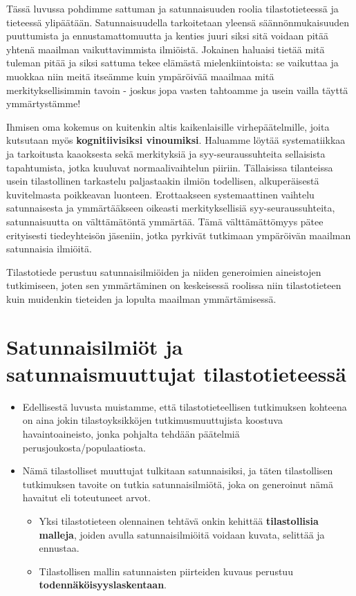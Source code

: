 \documentclass[
]{book}
\providecommand{\tightlist}{%
  \setlength{\itemsep}{0pt}\setlength{\parskip}{0pt}}
\begin{document}
Tässä luvussa pohdimme sattuman ja satunnaisuuden roolia tilastotieteessä ja tieteessä ylipäätään. Satunnaisuudella tarkoitetaan yleensä säännönmukaisuuden puuttumista ja ennustamattomuutta ja kenties juuri siksi sitä voidaan pitää yhtenä maailman vaikuttavimmista ilmiöistä. Jokainen haluaisi tietää mitä tuleman pitää ja siksi sattuma tekee elämästä mielenkiintoista: se vaikuttaa ja muokkaa niin meitä itseämme kuin ympäröivää maailmaa mitä merkityksellisimmin tavoin - joskus jopa vasten tahtoamme ja usein vailla täyttä ymmärtystämme!

Ihmisen oma kokemus on kuitenkin altis kaikenlaisille virhepäätelmille, joita kutsutaan myös \textbf{kognitiivisiksi vinoumiksi}. Haluamme löytää systematiikkaa ja tarkoitusta kaaoksesta sekä merkityksiä ja syy-seuraussuhteita sellaisista tapahtumista, jotka kuuluvat normaalivaihtelun piiriin. Tällaisissa tilanteissa usein tilastollinen tarkastelu paljastaakin ilmiön todellisen, alkuperäisestä kuvitelmasta poikkeavan luonteen. Erottaakseen systemaattinen vaihtelu satunnaisesta ja ymmärtääkseen oikeasti merkityksellisiä syy-seuraussuhteita, satunnaisuutta on välttämätöntä ymmärtää. Tämä välttämättömyys pätee erityisesti tiedeyhteisön jäseniin, jotka pyrkivät tutkimaan ympäröivän maailman satunnaisia ilmiöitä.

Tilastotiede perustuu satunnaisilmiöiden ja niiden generoimien aineistojen tutkimiseen, joten sen ymmärtäminen on keskeisessä roolissa niin tilastotieteen kuin muidenkin tieteiden ja lopulta maailman ymmärtämisessä.

\hypertarget{alaluku41}{%
\section{Satunnaisilmiöt ja satunnaismuuttujat tilastotieteessä}\label{alaluku41}}

\begin{itemize}
\tightlist
\item
  Edellisestä luvusta muistamme, että tilastotieteellisen tutkimuksen kohteena on aina jokin tilastoyksikköjen tutkimusmuuttujista koostuva havaintoaineisto, jonka pohjalta tehdään päätelmiä perusjoukosta/populaatiosta.
\item
  Nämä tilastolliset muuttujat tulkitaan satunnaisiksi, ja täten tilastollisen tutkimuksen tavoite on tutkia satunnaisilmiötä, joka on generoinut nämä havaitut eli toteutuneet arvot.

  \begin{itemize}
  \tightlist
  \item
    Yksi tilastotieteen olennainen tehtävä onkin kehittää \textbf{tilastollisia malleja}, joiden avulla satunnaisilmiöitä voidaan kuvata, selittää ja ennustaa.
  \item
    Tilastollisen mallin satunnaisten piirteiden kuvaus perustuu \textbf{todennäköisyyslaskentaan}.
  \end{itemize}
\end{itemize}
\end{document}
